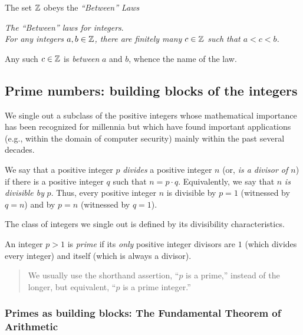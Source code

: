 The set $\mathbb{Z}$ obeys the {\it ``Between'' Laws}

\medskip

\noindent
{\it The ``Between'' laws for integers}. \\
%
{\it For any integers $a, b \in \mathbb{Z}$, there are finitely many $c \in
  \mathbb{Z}$ such that $a < c < b$.}

\smallskip

Any such $c \in \mathbb{Z}$ is {\em between} $a$ and $b$, whence the name of
the law.


\subsection{Prime numbers: building blocks of the integers}
\label{sec:primes}

We single out a subclass of the positive integers whose mathematical
importance has been recognized for millennia but which have found
important applications (e.g., within the domain of computer security)
mainly within the past several decades.

We say that a positive integer $p$ {\it divides} a positive integer
$n$ (or, {\it is a divisor of $n$}) if
there is a positive integer $q$ such that $n = p \cdot q$.
Equivalently, we say that $n$ {\it is divisible
  by} $p$.  Thus, every positive
integer $n$ is divisible by $p=1$ (witnessed by $q=n$) and by $p=n$
(witnessed by $q=1$).

The class of integers we single out is defined by its divisibility
characteristics.

An integer $p >1$ is {\it prime}
if its {\em only} positive integer divisors are $1$ (which divides
every integer) and itself (which is always a divisor).
\begin{quote}
We usually use the shorthand assertion, ``$p$ is a prime,'' instead of
the longer, but equivalent, ``$p$ is a prime integer.''
\end{quote}

\subsubsection{Primes as building blocks: The Fundamental Theorem of Arithmetic}
\label{sec:prime-factoriation}


